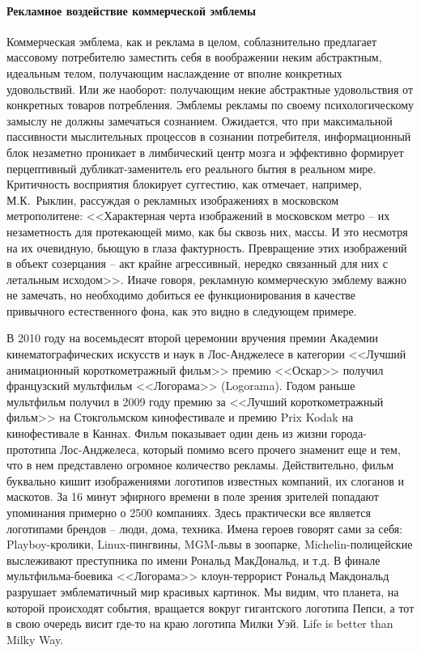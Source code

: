 \paragraph{Рекламное воздействие коммерческой эмблемы}

Коммерческая эмблема, как и реклама в целом, соблазнительно предлагает массовому
потребителю заместить себя в воображении неким абстрактным, идеальным телом,
получающим наслаждение от вполне конкретных удовольствий. Или же наоборот:
получающим некие абстрактные удовольствия от конкретных товаров потребления.
Эмблемы рекламы по своему психологическому замыслу не должны замечаться сознанием.
Ожидается, что при максимальной пассивности мыслительных процессов в сознании
потребителя, информационный блок незаметно проникает в лимбический центр  мозга
и эффективно формирует перцептивный дубликат-заменитель его реального бытия в
реальном мире. Критичность восприятия блокирует суггестию, как отмечает, например,
М.К.~Рыклин, рассуждая о рекламных изображениях в московском метрополитене:
<<Характерная черта изображений в московском метро -- их незаметность для
протекающей мимо, как бы сквозь них, массы. И это несмотря на их очевидную,
бьющую в глаза фактурность. Превращение этих изображений в объект созерцания --
акт крайне агрессивный, нередко связанный для них с летальным
исходом>>.\autocite{рыклин1992тела}\autocite[][41]{ryklin1992}
Иначе говоря, рекламную коммерческую эмблему важно не замечать, но необходимо
добиться ее функционирования в качестве привычного естественного фона, как это
видно в следующем примере.

В 2010 году на восемьдесят второй церемонии вручения премии Академии
кинематографических искусств и наук в Лос-Анджелесе в категории <<Лучший
анимационный короткометражный фильм>> премию <<Оскар>> получил французский
мультфильм <<Логорама>> (Logorama). Годом раньше мультфильм получил в 2009 году
премию за <<Лучший короткометражный фильм>> на Стокгольмском кинофестивале и премию
Prix Kodak на кинофестивале в Каннах. Фильм показывает один день из жизни
города-прототипа Лос-Анджелеса, который помимо всего прочего знаменит еще и
тем, что в нем представлено огромное количество рекламы. Действительно, фильм
буквально кишит изображениями логотипов известных компаний, их слоганов и маскотов.
За 16 минут эфирного времени в поле зрения зрителей попадают упоминания примерно
о 2500 компаниях. Здесь практически все является логотипами брендов -- люди,
дома, техника. Имена героев говорят сами за себя: Playboy-кролики,
Linux-пингвины, MGM-львы в зоопарке, Michelin-полицейские выслеживают
преступника по имени Рональд МакДональд, и т.д. В финале мультфильма-боевика
<<Логорама>> клоун-террорист Рональд Макдональд разрушает эмблематичный мир
красивых картинок. Мы видим, что планета, на которой происходят события,
вращается вокруг гигантского логотипа Пепси, а тот в свою очередь висит где-то
на краю логотипа Милки Уэй. Life is better than Milky Way.

